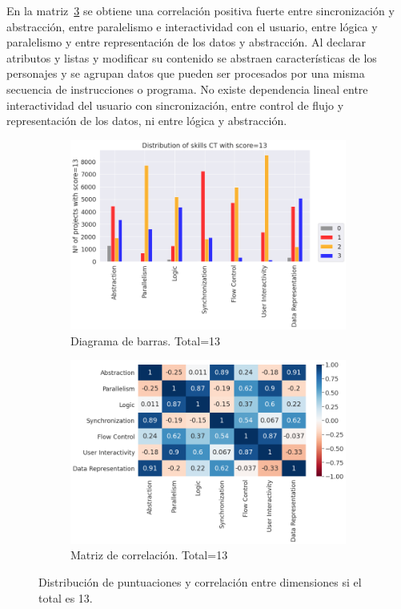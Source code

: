 \documentclass[a4paper, 12pt]{book}
\begin{document}
En la matriz~\ref{fig:corr13} se obtiene una correlación positiva fuerte entre sincronización y abstracción, entre paralelismo e interactividad con el usuario, entre lógica y paralelismo 
y entre representación de los datos y abstracción. Al declarar atributos y listas y modificar su contenido se abstraen características de los personajes y se agrupan datos que pueden ser procesados por una misma secuencia de instrucciones o programa. No existe dependencia lineal entre interactividad del usuario con sincronización, entre control de flujo y representación de los datos, ni entre lógica y abstracción.

\begin{figure}[H]
    \centering
    \begin{subfigure}[h]{.49\textwidth} 
        \includegraphics[width=\textwidth]{img/distribucion_13_Scratch}
        \caption{Diagrama de barras. Total=13}
        \label{fig:total13}
    \end{subfigure}       
    \begin{subfigure}[h]{.49\textwidth} 
        \includegraphics[width=\textwidth]{img/corr_13_Scratch}
        \caption{Matriz de correlación. Total=13}
        \label{fig:corr13}
    \end{subfigure}
     \caption{Distribución de puntuaciones y correlación entre dimensiones si el total es 13.}
\end{figure}
\end{document}
